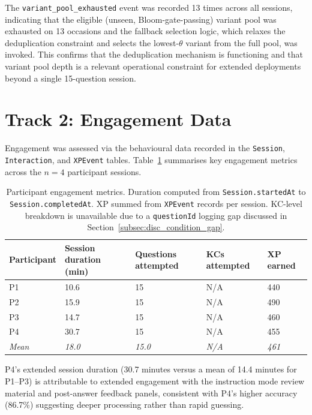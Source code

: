 The \texttt{variant\_pool\_exhausted} event was recorded 13 times across all
sessions, indicating that the eligible (unseen, Bloom-gate-passing) variant
pool was exhausted on 13 occasions and the fallback selection logic,
which relaxes the deduplication constraint and selects the lowest-$\theta$
variant from the full pool, was invoked. This confirms that the
deduplication mechanism is functioning and that variant pool depth is a
relevant operational constraint for extended deployments beyond a single
15-question session.

\section{Track 2: Engagement Data}
\label{sec:results_engagement}

Engagement was assessed via the behavioural data recorded in the
\texttt{Session}, \texttt{Interaction}, and \texttt{XPEvent} tables.
Table~\ref{tab:engagement} summarises key engagement metrics across the
$n = 4$ participant sessions.

\begin{table}[H]
\centering
\caption[Participant engagement metrics.]{Participant engagement metrics. Duration computed from
\texttt{Session.startedAt} to \texttt{Session.completedAt}. XP summed from
\texttt{XPEvent} records per session. KC-level breakdown is unavailable due
to a \texttt{questionId} logging gap discussed in
Section~\ref{subsec:disc_condition_gap}.}
\label{tab:engagement}
\renewcommand{\arraystretch}{1.25}
\begin{tabularx}{\textwidth}{lXXXX}
\toprule
\textbf{Participant} & \textbf{Session duration (min)} & \textbf{Questions attempted}
  & \textbf{KCs attempted} & \textbf{XP earned} \\
\midrule
P1 & 10.6 & 15 & N/A & 440 \\
P2 & 15.9 & 15 & N/A & 490 \\
P3 & 14.7 & 15 & N/A & 460 \\
P4 & 30.7 & 15 & N/A & 455 \\
\midrule
\textit{Mean} & \textit{18.0} & \textit{15.0} & \textit{N/A} & \textit{461} \\
\bottomrule
\end{tabularx}
\end{table}

P4's extended session duration (30.7 minutes versus a mean of 14.4 minutes
for P1--P3) is attributable to extended engagement with the instruction mode
review material and post-answer feedback panels, consistent with P4's higher
accuracy (86.7\%) suggesting deeper processing rather than rapid guessing.

